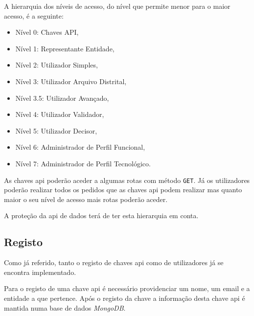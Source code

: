 A hierarquia dos níveis de acesso, do nível que permite menor para o maior acesso, é a seguinte:
\begin{itemize}
    \item Nível 0: Chaves API,
    \item Nível 1: Representante Entidade,
    \item Nível 2: Utilizador Simples,
    \item Nível 3: Utilizador Arquivo Distrital,
    \item Nível 3.5: Utilizador Avançado,
    \item Nível 4: Utilizador Validador,
    \item Nível 5: Utilizador Decisor,
    \item Nível 6: Administrador de Perfil Funcional,
    \item Nível 7: Administrador de Perfil Tecnológico.
\end{itemize}

As chaves \acrshort{api} poderão aceder a algumas rotas com método \texttt{GET}.
Já os utilizadores poderão realizar todos os pedidos que as chaves \acrshort{api} podem realizar mas quanto 
maior o seu nível de acesso mais rotas poderão aceder.

A proteção da \acrshort{api} de dados terá de ter esta hierarquia em conta.

\subsection{Registo}

Como já referido, tanto o registo de chaves \acrshort{api} como de utilizadores já se encontra implementado.

Para o registo de uma chave \acrshort{api} é necessário providenciar um nome, um email e a entidade a que pertence. 
Após o registo da chave a informação desta chave \acrshort{api} é mantida numa base de dados \textit{MongoDB}.


